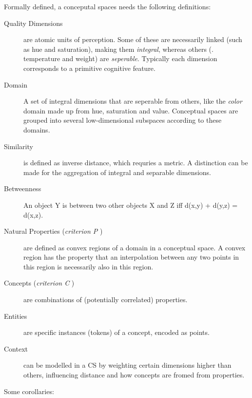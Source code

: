 Formally defined, a conceputal spaces needs the following definitions:
\begin{description}
    \item[Quality Dimensions] are atomic units of perception. Some of these are necessarily linked (such as hue and saturation), making them \textit{integral}, whereas others (\eg. temperature and weight) are \textit{seperable}. Typically each dimension corresponds to a primitive cognitive feature.
    \item[Domain] A set of integral dimensions that are seperable from others, like the \textit{color} domain made up from hue, saturation and value. Conceptual spaces are grouped into several low-dimensional subspaces according to these domains.
    \item[Similarity] is defined as inverse distance, which requries a metric. A distinction can be made for the aggregation of integral and separable dimensions. 
    \item[Betweenness] An object Y is between two other objects X and Z iff d(x,y) + d(y,z) = d(x,z).
    \item[Natural Properties (\textit{criterion P} \cite{Gardenfors2000a})] are defined as convex regions of a domain in a conceptual space. A convex region has the property that an interpolation between any two points in this region is necessarily also in this region. 
    \item[Concepts (\textit{criterion C} \cite{Gardenfors2000a})] are combinations of (potentially correlated) properties.  \cite[8]{Gardenfors2004}
    \item[Entities] are specific instances (tokens) of a concept, encoded as points. 
    \item[Context] can be modelled in a CS by weighting certain dimensions higher than others, influencing distance and how concepts are fromed from properties.
\end{description}

Some corollaries: 

